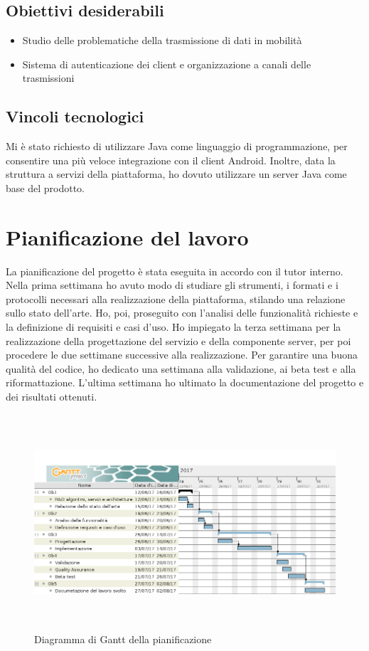    \subsection{Obiettivi desiderabili}
   \begin{itemize}
      \item{Studio delle problematiche della trasmissione di dati in mobilità}
      \item{Sistema di autenticazione dei client e organizzazione a canali delle trasmissioni}
   \end{itemize}

   \subsection{Vincoli tecnologici}
   Mi è stato richiesto di utilizzare Java come linguaggio di programmazione, per consentire una più veloce integrazione con il client Android. Inoltre, data la struttura a servizi della piattaforma, ho dovuto utilizzare un server Java come base del prodotto.

\section{Pianificazione del lavoro}
La pianificazione del progetto è stata eseguita in accordo con il tutor interno. Nella prima settimana ho avuto modo di studiare gli strumenti, i formati e i protocolli necessari alla realizzazione della piattaforma, stilando una relazione sullo stato dell'arte. Ho, poi, proseguito con l'analisi delle funzionalità richieste e la definizione di requisiti e casi d'uso. Ho impiegato la terza settimana per la realizzazione della progettazione del servizio e della componente server, per poi procedere le due settimane successive alla realizzazione. Per garantire una buona qualità del codice, ho dedicato una settimana alla validazione, ai beta test e alla riformattazione. L'ultima settimana ho ultimato la documentazione del progetto e dei risultati ottenuti.
\begin{figure}[H]
   \begin{center}
      \includegraphics[height=8cm,width=15cm,keepaspectratio]{immagini/pianificazione-gantt}
      \caption{Diagramma di Gantt della pianificazione}
   \end{center}
\end{figure}


